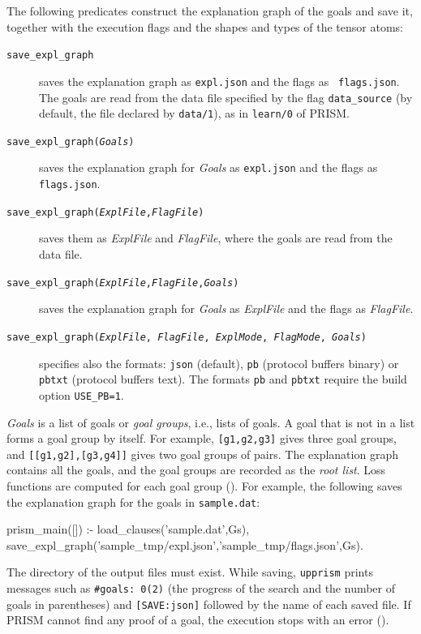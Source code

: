 \documentclass[a4paper]{report}
\begin{document}
The following predicates construct the explanation graph of the goals
and save it, together with the execution flags and the shapes and types of
the tensor atoms:
\begin{description}
	\item[{\tt save\_expl\_graph}]
	saves the explanation graph as {\tt expl.json} and the flags as {\tt
		flags.json}.  The goals are read from the data file specified by the
	flag {\tt data\_source} (by default, the file declared by {\tt data/1}),
	as in {\tt learn/0} of PRISM.
	\item[{\tt save\_expl\_graph({\it Goals})}]
	saves the explanation graph for {\it Goals} as {\tt expl.json} and the flags as {\tt flags.json}.
	\item[{\tt save\_expl\_graph({\it ExplFile},{\it FlagFile})}]
	saves them as {\it ExplFile} and {\it FlagFile}, where the goals are read from the data file.
	\item[{\tt save\_expl\_graph({\it ExplFile},{\it FlagFile},{\it Goals})}]
	saves the explanation graph for {\it Goals} as {\it ExplFile} and the flags as {\it FlagFile}.
	\item[{\tt save\_expl\_graph({\it ExplFile}, {\it FlagFile}, {\it ExplMode}, {\it FlagMode}, {\it Goals})}]
	specifies also the formats: {\tt json} (default), {\tt pb} (protocol
	buffers binary) or {\tt pbtxt} (protocol buffers text).  The formats
	{\tt pb} and {\tt pbtxt} require the build option {\tt USE\_PB=1}.
\end{description}
{\it Goals} is a list of goals or {\em goal groups}, i.e., lists of goals.
A goal that is not in a list forms a goal group by itself.  For example,
{\tt [g1,g2,g3]} gives three goal groups, and {\tt [[g1,g2],[g3,g4]]} gives
two goal groups of pairs.  The explanation graph contains all the goals,
and the goal groups are recorded as the {\em root list}.  Loss functions
are computed for each goal group ().  For example,
the following saves the explanation graph for the goals in {\tt sample.dat}:
\begin{prologcode}
prism_main([]) :-
    load_clauses('sample.dat',Gs),
    save_expl_graph('sample_tmp/expl.json','sample_tmp/flags.json',Gs).
\end{prologcode}
The directory of the output files must exist.  While saving, {\tt upprism}
prints messages such as {\tt \#goals: 0(2)} (the progress of the search and the
number of goals in parentheses) and {\tt [SAVE:json]} followed by the name of
each saved file.  If PRISM cannot find any proof of a goal, the execution stops
with an error ().
\end{document}

